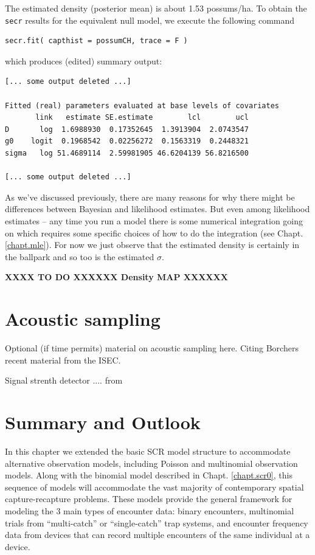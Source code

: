 The estimated density (posterior mean) is about 1.53 possums/ha.
To obtain the \mbox{\tt secr} results for the equivalent null model, we execute the following command
\begin{verbatim}
secr.fit( capthist = possumCH, trace = F )
\end{verbatim}
which produces (edited) summary output:
\begin{verbatim}
[... some output deleted ...]

Fitted (real) parameters evaluated at base levels of covariates
       link   estimate SE.estimate        lcl        ucl
D       log  1.6988930  0.17352645  1.3913904  2.0743547
g0    logit  0.1968542  0.02256272  0.1563319  0.2448321
sigma   log 51.4689114  2.59981905 46.6204139 56.8216500

[... some output deleted ...]
\end{verbatim}
As we've discussed previously,
there are many reasons for why there might be differences 
between Bayesian and likelihood estimates.
But even among likelihood estimates -- any time you run a model there
is some numerical integration going on which requires some specific
choices of how to do the integration (see
Chapt. \ref{chapt.mle}). 
For now we just observe that the estimated density is certainly in the
ballpark and so too is the estimated $\sigma$.


{\bf XXXX TO DO XXXXXX Density MAP XXXXXX} 


\section{Acoustic sampling}


Optional (if time permits) material on acoustic sampling here. Citing Borchers
recent material from the ISEC. 

Signal strenth detector .... from \citep{efford_etal:2009ecol}

\section{Summary and Outlook}

In this chapter we extended the basic SCR model structure to
accommodate alternative observation models, including Poisson and
multinomial observation models.  Along with the binomial model
described in Chapt. \ref{chapt.scr0}, this sequence of models will
accommodate the vast majority of contemporary spatial
capture-recapture problems. These models provide the general framework
for modeling the 3 main types of encounter data: binary encounters,
multinomial trials from ``multi-catch'' or ``single-catch''
\citep{efford:2004, efford:2011} trap systems, and encounter frequency
data from devices that can record multiple encounters of the same
individual at a device.


